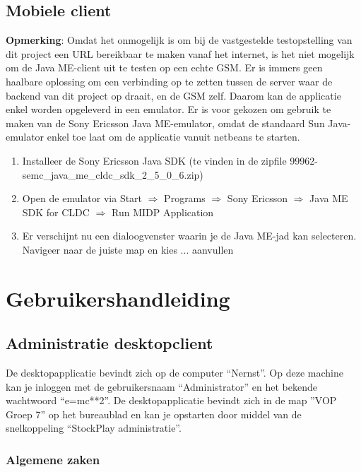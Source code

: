 \subsection{Mobiele client}
\textbf{Opmerking}: Omdat het onmogelijk is om bij de vastgestelde testopstelling van dit project een URL bereikbaar te maken vanaf het internet, is het niet mogelijk om de Java ME-client uit te testen op een echte GSM. Er is immers geen haalbare oplossing om een verbinding op te zetten tussen de server waar de backend van dit project op draait, en de GSM zelf. Daarom kan de applicatie enkel worden opgeleverd in een emulator. Er is voor gekozen om gebruik te maken van de Sony Ericsson Java ME-emulator, omdat de standaard Sun Java-emulator enkel toe laat om de applicatie vanuit netbeans te starten.

\begin{enumerate}
\item{Installeer de Sony Ericsson Java SDK (te vinden in de zipfile 99962-semc\_java\_me\_cldc\_sdk\_2\_5\_0\_6.zip)}
\item{Open de emulator via Start $\Rightarrow$ Programs $\Rightarrow$ Sony Ericsson $\Rightarrow$ Java ME SDK for CLDC $\Rightarrow$ Run MIDP Application}
\item{Er verschijnt nu een dialoogvenster waarin je de Java ME-jad kan selecteren. Navigeer naar de juiste map en kies ...}
\todo aanvullen
\end{enumerate}


%
%

\section{Gebruikershandleiding}

\subsection{Administratie desktopclient}

De desktopapplicatie bevindt zich op de computer ``Nernst''.
Op deze machine kan je inloggen met de gebruikersnaam ``Administrator'' en het bekende wachtwoord ``e=mc**2''.
De desktopapplicatie bevindt zich in de map ''VOP Groep 7'' op het bureaublad en kan je opstarten door middel van de snelkoppeling ``StockPlay administratie''.

\subsubsection{Algemene zaken}
\label{sec:handl:admin:algemeen}

